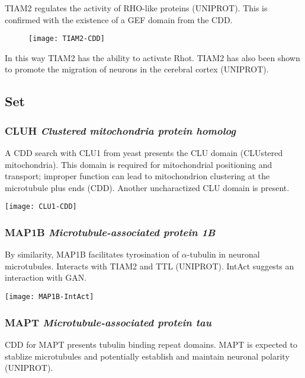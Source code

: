 TIAM2 regulates the activity of RHO-like proteins (UNIPROT). This is confirmed
with the existence of a GEF domain from the CDD.

\begin{figure}[h]
  \texttt{[image: TIAM2-CDD]}
\end{figure}

In this way TIAM2 has the ability to activate Rhot. TIAM2 has also been shown to
promote the migration of neurons in the cerebral cortex (UNIPROT).

\subsection{Set}

\subsubsection{CLUH \textit{Clustered mitochondria protein homolog}}

A CDD search with CLU1 from yeast presents the CLU domain (CLUstered
mitochondria). This domain is required for mitochondrial positioning and
transport; improper function can lead to mitochondrion clustering at the
microtubule plus ends (CDD). Another uncharactized CLU domain is present.

\begin{center}
  \texttt{[image: CLU1-CDD]}
\end{center}

\subsubsection{MAP1B \textit{Microtubule-associated protein 1B}}

By similarity, MAP1B facilitates tyrosination of $\alpha$-tubulin in
neuronal microtubules. Interacts with TIAM2 and TTL (UNIPROT). IntAct
suggests an interaction with GAN.

\begin{center}
  \texttt{[image: MAP1B-IntAct]}
\end{center}

\subsubsection{MAPT \textit{Microtubule-associated protein tau}}

CDD for MAPT presents tubulin binding repeat domains. MAPT is expected to
stablize microtubules and potentially establish and maintain neuronal polarity
(UNIPROT).

